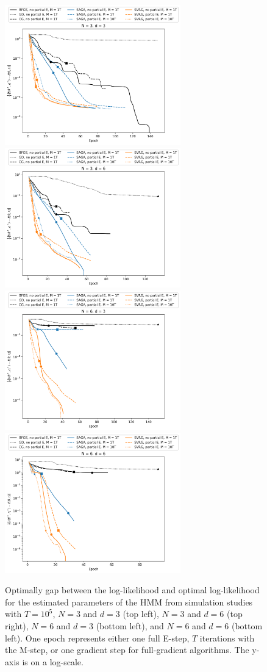 \begin{figure}
    \centering
    \includegraphics[width=3in]{../plt/log-like_v_epoch_T-100000-K-3-1-d-3-000.png}
    \includegraphics[width=3in]{../plt/log-like_v_epoch_T-100000-K-3-1-d-6-000.png}
    \\
    \includegraphics[width=3in]{../plt/log-like_v_epoch_T-100000-K-6-1-d-3-000.png}
    \includegraphics[width=3in]{../plt/log-like_v_epoch_T-100000-K-6-1-d-6-000.png}   
    \caption{Optimally gap between the log-likelihood and optimal log-likelihood for the estimated parameters of the HMM from simulation studies with $T=10^{5}$, $N=3$ and $d=3$ (top left), $N=3$ and $d=6$ (top right), $N=6$ and $d=3$ (bottom left), and $N=6$ and $d=6$ (bottom left). One epoch represents either one full E-step, $T$ iterations with the M-step, or one gradient step for full-gradient algorithms. The y-axis is on a log-scale.}
    \label{fig:ll_trace_sim}
\end{figure}
